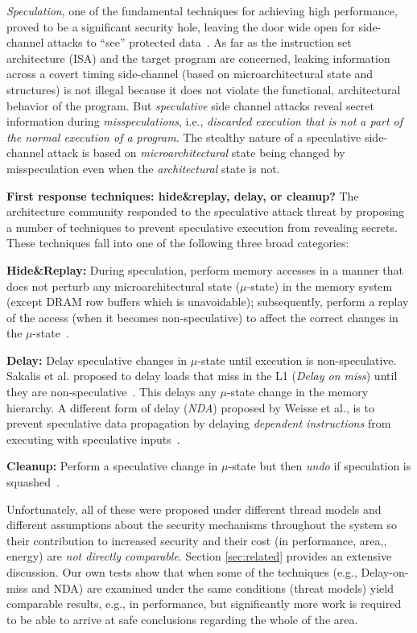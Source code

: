 \emph{Speculation}, one of the fundamental techniques for achieving high
performance, proved to be a significant security hole, leaving the door wide
open for side-channel attacks to ``see'' protected data~\cite{kocher_spectre_2018,lipp_meltdown_2018}.
As far as the instruction set architecture (ISA) and the target program are
concerned, leaking information across a covert timing side-channel (based on microarchitectural state and structures) is not illegal
because it does not violate the functional, architectural behavior of the program.
But \emph{speculative} side channel attacks reveal secret information during \emph{misspeculations}, 
i.e., \emph{discarded execution that is not a part of the normal execution of a program}.
The stealthy nature of a speculative side-channel attack is based on
\emph{microarchitectural} state being changed by misspeculation even when the \emph{architectural}
state is not.

\noindent \textbf{First response techniques: hide\&replay, delay, or cleanup?}
The architecture community responded to the speculative attack threat by proposing a number of techniques to prevent speculative execution from revealing secrets. These techniques fall into one of the following three broad categories:
\squishlist
\item{\textbf{Hide\&Replay:}} During speculation, perform memory accesses in a manner that does not perturb any microarchitectural state ($\mu$-state) in the memory system (except DRAM row buffers which is unavoidable); subsequently, perform a replay of the access (when it becomes non-speculative) to affect the correct changes in the $\mu$-state~\cite{yan_invisispec:MICRO2018,sakalis2019ghost}. 
\item{\textbf{Delay:}} Delay speculative changes in $\mu$-state until execution is non-speculative. Sakalis et al. proposed to delay loads that miss in the L1 (\emph{Delay on miss}) until they are non-speculative~\cite{sakalis2019efficient}. This delays any $\mu$-state change in the memory hierarchy. A different form of delay (\emph{NDA}) proposed by Weisse et al., is to prevent speculative data propagation by delaying \emph{dependent instructions} from executing with speculative inputs~\cite{weisse2019nda}.
\item{\textbf{Cleanup:}} Perform a speculative change in $\mu$-state but then \emph{undo} if speculation is squashed~\cite{saileshwar2019cleanupspec}.
\squishend

Unfortunately, all of these were proposed under different thread models and different assumptions about the security mechanisms throughout the system so their contribution to increased security and their cost (in performance, area,, energy) are \emph{not directly comparable}. Section \ref{sec:related} provides an extensive discussion. Our own tests show that when some of the techniques (e.g., Delay-on-miss and NDA) are examined under the same conditions (threat models) yield comparable results, e.g., in performance, but significantly more work is required to be able to arrive at safe conclusions regarding the whole of the area.

